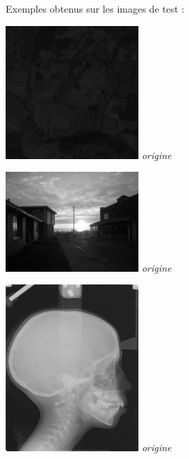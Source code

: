 \documentclass[a4,12pt]{article}
\begin{document}
Exemples obtenus sur les images de test :
\begin{center}
	\begin{minipage}[c]{0.30\linewidth}
		\begin{center}
			\includegraphics[width = 50mm]{./img/aquitain.jpg}
			\textit{origine}\\
		\end{center}
	\end{minipage}
	\begin{minipage}[c]{0.30\linewidth}
		\begin{center}
			\includegraphics[width = 50mm]{./img/couchersoleil.jpg}
			\textit{origine}\\
		\end{center}
	\end{minipage}
	\begin{minipage}[c]{0.30\linewidth}
		\begin{center}
			\includegraphics[width = 50mm]{./img/radio.jpg}
			\textit{origine}\\
		\end{center}
	\end{minipage}
\end{center}
\end{document}
